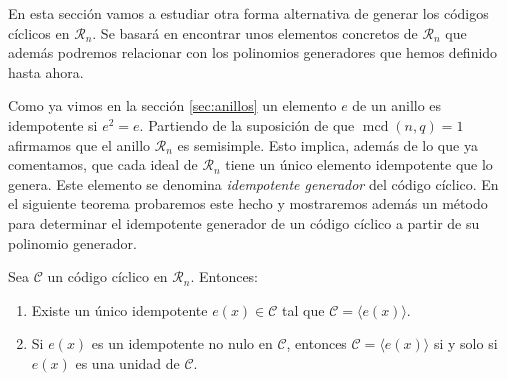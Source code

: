 En esta sección vamos a estudiar otra forma alternativa de generar los códigos cíclicos en \(\mathcal R_n\).
Se basará en encontrar unos elementos concretos de \(\mathcal R_n\) que además podremos relacionar con los polinomios generadores que hemos definido hasta ahora.

Como ya vimos en la sección \ref{sec:anillos} un elemento \(e\) de un anillo es idempotente si \(e^2 = e\).
Partiendo de la suposición de que \(\operatorname{mcd}(n, q) = 1\) afirmamos que el anillo \(\mathcal R_n\) es semisimple.
Esto implica, además de lo que ya comentamos, que cada ideal de \(\mathcal R_n\) tiene un único elemento idempotente que lo genera.
Este elemento se denomina \textit{idempotente generador} del código cíclico.
En el siguiente teorema probaremos este hecho y mostraremos además un método para determinar el idempotente generador de un código cíclico a partir de su polinomio generador.

\begin{theorem}
  \label{th:idempotente-unico-unidad}
  Sea \(\mathcal C\) un código cíclico en \(\mathcal R_n\). Entonces:
  \begin{enumerate}
    \item Existe un único idempotente \(e(x) \in \mathcal C\) tal que \(\mathcal C = \langle e(x)\rangle\).
    \item \label{th:idempotente-unico-unidad:unidad} Si \(e(x)\) es un idempotente no nulo en \(\mathcal C\), entonces \(\mathcal C = \langle e(x)\rangle\) si y solo si \(e(x)\) es una unidad de \(\mathcal C\).
  \end{enumerate}
\end{theorem}

